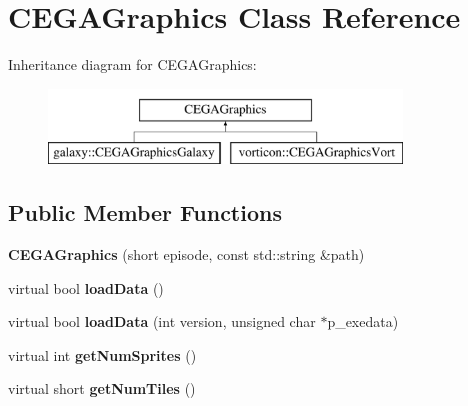 \hypertarget{class_c_e_g_a_graphics}{
\section{CEGAGraphics Class Reference}
\label{class_c_e_g_a_graphics}
}
Inheritance diagram for CEGAGraphics:\begin{figure}[H]
\begin{center}
\leavevmode
\includegraphics[height=2cm]{class_c_e_g_a_graphics}
\end{center}
\end{figure}
\subsection*{Public Member Functions}
\begin{DoxyCompactItemize}
\item 
\hypertarget{class_c_e_g_a_graphics_a5f6b206f7ac849b998616f5f147b658b}{
{\bfseries CEGAGraphics} (short episode, const std::string \&path)}
\label{class_c_e_g_a_graphics_a5f6b206f7ac849b998616f5f147b658b}

\item 
\hypertarget{class_c_e_g_a_graphics_abaf353551babb57203d0ff405e92a7cb}{
virtual bool {\bfseries loadData} ()}
\label{class_c_e_g_a_graphics_abaf353551babb57203d0ff405e92a7cb}

\item 
\hypertarget{class_c_e_g_a_graphics_a3d718558abd3f7081d52f00789c351fb}{
virtual bool {\bfseries loadData} (int version, unsigned char $\ast$p\_\-exedata)}
\label{class_c_e_g_a_graphics_a3d718558abd3f7081d52f00789c351fb}

\item 
\hypertarget{class_c_e_g_a_graphics_a4765ba6dec644d75eef34ff80fc7a401}{
virtual int {\bfseries getNumSprites} ()}
\label{class_c_e_g_a_graphics_a4765ba6dec644d75eef34ff80fc7a401}

\item 
\hypertarget{class_c_e_g_a_graphics_a0aa3a17db36fc0fe632d47c727cc3651}{
virtual short {\bfseries getNumTiles} ()}
\label{class_c_e_g_a_graphics_a0aa3a17db36fc0fe632d47c727cc3651}

\end{DoxyCompactItemize}
